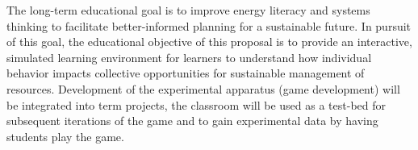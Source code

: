 \documentclass[11pt,a4paper]{article}
\begin{document}
The long-term educational goal is to 
improve energy literacy and systems thinking 
to facilitate better-informed planning for a sustainable future. 
In pursuit of this goal, the educational objective of this proposal 
is to provide an interactive, simulated learning environment for learners 
to understand how individual behavior impacts collective opportunities 
for sustainable management of resources. 
Development of the experimental apparatus (game development) will be integrated into term projects, 
the classroom will be used as a test-bed for subsequent iterations of the game 
and to gain experimental data by having students play the game. 








\end{document}
